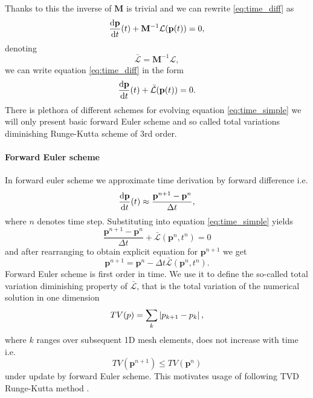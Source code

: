 Thanks to this the inverse of $\mathbf{M}$ is trivial and we can rewrite 
\eqref{eq:time_diff} as
\begin{equation}
     \frac{\text{d}\mathbf{p}}{\text{d}t}(t) + \mathbf{M}^{-1}\mathcal{L}(\mathbf{p}(t)) = 0,
\end{equation}
denoting
\begin{equation}
    \bar{\mathcal{L}} =\mathbf{M}^{-1}\mathcal{L}, 
\end{equation}
we can write equation 
\eqref{eq:time_diff} in the form
\begin{equation}\label{eq:time_simple}
\frac{\text{d}\mathbf{p}}{\text{d}t}(t) + \bar{\mathcal{L}}(\mathbf{p}(t)) = 0.
\end{equation}
There is plethora of different schemes for evolving equation 
\eqref{eq:time_simple} we will only present basic forward Euler scheme and so called 
total variations diminishing Runge-Kutta scheme of 3rd order.


\paragraph{Forward Euler scheme} In forward euler scheme we approximate time 
derivation by forward difference i.e.
\begin{equation}
    \frac{\text{d}\mathbf{p}}{\text{d}t}(t) \approx     \frac{\mathbf{p}^{n + 1} - 
    \mathbf{p}^{n}}{\Delta t},
\end{equation}
where $n$ denotes time step. Substituting into equation \eqref{eq:time_simple} 
yields
\begin{equation}
    \frac{\mathbf{p}^{n + 1} - \mathbf{p}^{n}}{\Delta t} + 
     \bar{\mathcal{L}}(\mathbf{p}^n, t^n) = 0
\end{equation}
and after rearranging to obtain explicit equation for $\mathbf{p}^{n + 1}$ we 
get
\begin{equation}
\mathbf{p}^{n + 1} = \mathbf{p}^{n} - {\Delta t} 
\bar{\mathcal{L}}(\mathbf{p}^n, t^n).
\end{equation}
Forward Euler scheme is first order in time. We use it to define the so-called 
total variation diminishing property of $\bar{\mathcal{L}}$, that is the total 
variation of the numerical solution in one dimension
\begin{equation}\label{eq:TV}
    TV(p) = \sum_{k} \left\lvert p_{k + 1} - p_{k}\right\rvert,    
\end{equation}
where $k$ ranges over subsequent 1D mesh elements, does not increase with time i.e.
\begin{equation}
    TV(\mathbf{p}^{n + 1}) \leq TV(\mathbf{p}^{n})
\end{equation}
under update by forward Euler scheme.
This motivates usage of following TVD Runge-Kutta method \cite[p. 73]{Gottlieb2002}. 



